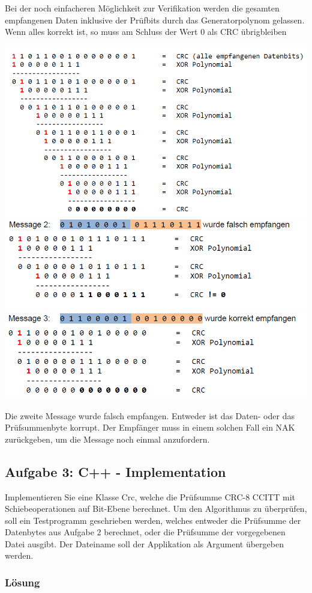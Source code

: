 Bei der noch einfacheren Möglichkeit zur Verifikation werden die gesamten empfangenen Daten inklusive der Prüfbits durch das Generatorpolynom gelassen. Wenn alles korrekt ist, so muss am Schluss der Wert 0 als CRC übrigbleiben

\begin{center}
  \includegraphics[width=.6\linewidth]{900-Praktika/prak06/crc3.PNG}
  \includegraphics[width=.6\linewidth]{900-Praktika/prak06/crc4.PNG}
  \includegraphics[width=.6\linewidth]{900-Praktika/prak06/crc5.PNG}
\end{center}

Die zweite Message wurde falsch empfangen. Entweder ist das Daten- oder das Prüfsummenbyte korrupt. Der Empfänger muss in einem solchen Fall ein NAK zurückgeben, um die Message noch einmal anzufordern.

\subsection{Aufgabe 3: C++ - Implementation}
Implementieren Sie eine Klasse Crc, welche die Prüfsumme CRC-8 CCITT mit Schiebeoperationen auf Bit-Ebene berechnet. Um den Algorithmus zu überprüfen, soll ein Testprogramm geschrieben werden, welches entweder die Prüfsumme der Datenbytes aus Aufgabe 2 berechnet, oder die Prüfsumme der vorgegebenen Datei ausgibt. Der Dateiname soll der Applikation als Argument übergeben werden.

\subsubsection{Lösung}

